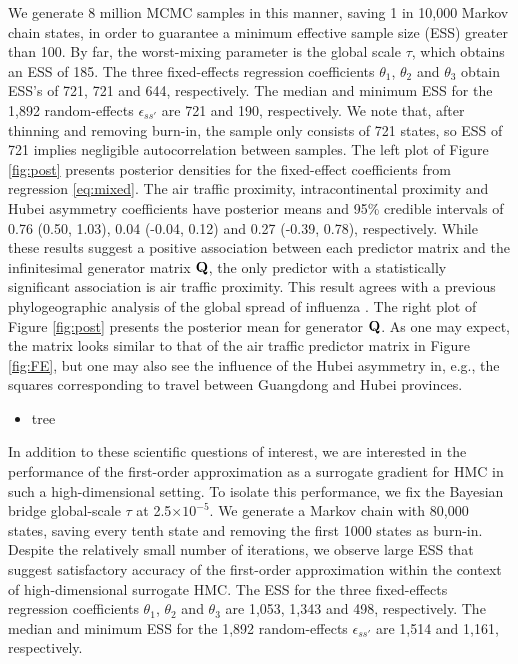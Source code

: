 \documentclass[12pt]{article} %
\begin{document}
We generate 8 million MCMC samples in this manner, saving 1 in 10,000 Markov chain states, in order to guarantee a minimum effective sample size (ESS) greater than 100.  By far, the worst-mixing parameter  is the global scale $\tau$, which obtains an ESS of 185.  The three fixed-effects regression coefficients $\theta_1$, $\theta_2$ and $\theta_3$ obtain ESS's of 721, 721 and 644, respectively.  The median and minimum ESS for the 1,892 random-effects $\epsilon_{ss'}$ are 721 and 190, respectively.  We note that, after thinning and removing burn-in, the sample only consists of 721 states, so ESS of 721 implies negligible autocorrelation between samples.  The left plot of Figure \ref{fig:post} presents posterior densities for the fixed-effect coefficients from regression \eqref{eq:mixed}.  The air traffic proximity, intracontinental proximity and Hubei asymmetry coefficients have posterior means and 95\% credible intervals of 0.76 (0.50, 1.03), 0.04 (-0.04, 0.12) and 0.27 (-0.39, 0.78), respectively. While these results suggest a positive association between each predictor matrix and the infinitesimal generator matrix $\mathbf{Q}$, the only predictor with a statistically significant association is air traffic proximity.  This result agrees with a previous phylogeographic analysis of the global spread of influenza \citep{holbrook2021massive}.  The right plot of Figure \ref{fig:post} presents the posterior mean for generator $\mathbf{Q}$.  As one may expect, the matrix looks similar to that of the air traffic predictor matrix in Figure \ref{fig:FE}, but one may also see the influence of the Hubei asymmetry in, e.g., the squares corresponding to travel between Guangdong and Hubei provinces.

\begin{itemize}
	\item tree
\end{itemize}

In addition to these scientific questions of interest, we are interested in the performance of the first-order approximation as a surrogate gradient for HMC in such a high-dimensional setting. To isolate this performance, we fix the Bayesian bridge global-scale $\tau$ at 2.5$\times10^{-5}$.  We generate a Markov chain with 80,000 states, saving every tenth state and removing the first 1000 states as burn-in.  Despite the relatively small number of iterations, we observe large ESS that suggest satisfactory accuracy of the first-order approximation within the context of high-dimensional surrogate HMC.  The ESS for the three fixed-effects regression coefficients $\theta_1$, $\theta_2$ and $\theta_3$ are 1,053, 1,343 and 498, respectively.  The median and minimum ESS for the 1,892 random-effects $\epsilon_{ss'}$ are 1,514 and 1,161, respectively.
\end{document}
